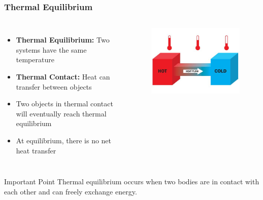 \documentclass{beamer}
\begin{document}
\begin{frame}
    \frametitle{Thermal Equilibrium}
    \begin{columns}
        \begin{itemize}
            \item \textbf{Thermal Equilibrium:} Two systems have the same temperature
            \item \textbf{Thermal Contact:} Heat can transfer between objects
            \item Two objects in thermal contact will eventually reach thermal equilibrium
            \item At equilibrium, there is no net heat transfer
        \end{itemize}
        
        \begin{center}
            \begin{figure}
                \centering
                \includegraphics[width=0.75\linewidth]{th-4247912930.jpg}
            \end{figure}
        \end{center}
    \end{columns}
    
    \begin{block}{Important Point}
        Thermal equilibrium occurs when two bodies are in contact with each other and can freely exchange energy.
    \end{block}
\end{frame}
\end{document}
